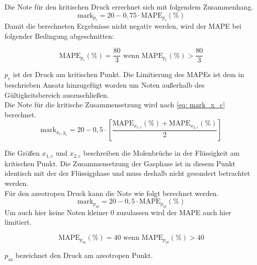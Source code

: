 \documentclass[../thesis.tex]{subfiles}
\begin{document}
Die Note für den kritischen Druck errechnet sich mit folgendem Zusammenhang.
\begin{equation}
	\mathrm{mark}_{p_{\mathrm{c}}} = 20 - 0,75 \cdot \mathrm{MAPE}_{p_\mathrm{c}}(\%)
\end{equation}
Damit die berechneten Ergebnisse nicht negativ werden, wird der MAPE bei folgender Bedingung abgeschnitten:

\begin{equation}
	\mathrm{MAPE}_{p_\mathrm{c}}(\%) = \dfrac{80}{3} \text{ wenn } \mathrm{MAPE}_{p_\mathrm{c}}(\%) > \dfrac{80}{3}
\end{equation}

$ p_\mathrm{c} $ ist der Druck am kritischen Punkt. Die Limitierung des MAPEs ist dem in \cite{jaubert2020benchmark} beschrieben Ansatz hinzugefügt worden um Noten außerhalb des Gültigkeitsbereich auszuschließen.
\\

Die Note für die kritische Zusammensetzung wird nach \autoref{eq: mark_x_c} berechnet.
\begin{equation}
\label{eq: mark_x_c}
\mathrm{mark}_{x_\mathrm{c},y_\mathrm{c}} = 20 - 0,5 \cdot \left[
	\dfrac{\mathrm{MAPE}_{x_{1,\mathrm{c}}}(\%) + \mathrm{MAPE}_{x_{2,\mathrm{c}}}(\%)}{2}
\right]
\end{equation}

Die Größen $ x_{1,\mathrm{c}} $ und $ x_{2,\mathrm{c}} $ beschreiben die Molenbrüche in der Flüssigkeit am kritischen Punkt. Die Zusammensetzung der Gasphase ist in diesem Punkt identisch mit der der Flüssigphase und muss deshalb nicht gesondert betrachtet werden.
\\

Für den azeotropen Druck kann die Note wie folgt berechnet werden.
\begin{equation}
	\mathrm{mark}_{p_{\mathrm{az}}} = 20 - 0,5 \cdot \mathrm{MAPE}_{p_\mathrm{az}}(\%)
\end{equation}
Um auch hier keine Noten kleiner 0 zuzulassen wird der MAPE auch hier limitiert.

\begin{equation}
	\label{eq: pheq_x_lim}
	\mathrm{MAPE}_{p_\mathrm{az}}(\%) = 40 \text{ wenn } \mathrm{MAPE}_{p_\mathrm{az}}(\%) > 40
\end{equation}

$ p_\mathrm{az} $ bezeichnet den Druck am azeotropen Punkt.
\\
\end{document}
